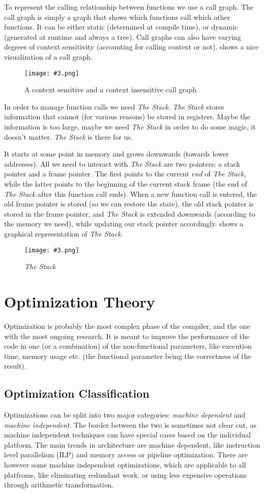 \documentclass{article}
\newcommand{\fig}[4]{
	\begin{figure}[#1]
		\center
		\texttt{[image: \#3.png]}
		\caption{#4}
		\label{fig:#3}
	\end{figure}
	}
\begin{document}
To represent the calling relationship between functions we use a call graph.
The call graph is simply a graph that shows which functions call which other functions.
It can be either static (determined at compile time), or dynamic (generated at runtime and always a tree).
Call graphs can also have varying degrees of context sensitivity (accounting for calling context or not).
 shows a nice visualization of a call graph.

\fig{h}{0.9}{calling}{A context sensitive and a context insensitive call graph}

In order to manage function calls we need \emph{The Stack}.
\emph{The Stack} stores information that cannot (for various reasons) be stored in registers.
Maybe the information is too large, maybe we need \emph{The Stack} in order to do some magic, it doesn't matter.
\emph{The Stack} is there for us.

It starts at some point in memory and grows downwards (towards lower addresses).
All we need to interact with \emph{The Stack} are two pointers: a stack pointer and a frame pointer.
The first points to the current \emph{end} of \emph{The Stack}, while the latter points to the beginning of the current stack frame (the end of \emph{The Stack} after this function call ends).
When a new function call is entered, the old frame pointer is stored (so we can restore the state), the old stack pointer is stored in the frame pointer, and \emph{The Stack} is extended downwards (according to the memory we need), while updating our stack pointer accordingly.
 shows a graphical representation of \emph{The Stack}.

\fig{h}{0.4}{thestack}{\emph{The Stack}}

\section{Optimization Theory}
Optimization is probably the most complex phase of the compiler, and the one with the most ongoing research.
It is meant to improve the performance of the code in one (or a combination) of the non-functional parameters, like execution time, memory usage etc. (the functional parameter being the correctness of the result).

\subsection{Optimization Classification}
Optimizations can be split into two major categories: \emph{machine dependent} and \emph{machine independent}.
The border between the two is sometimes not clear cut, as machine independent techniques can have special cases based on the individual platform.
The main trends in architecture are machine dependent, like instruction level parallelism (ILP) and memory access or pipeline optimization.
There are however some machine independent optimizations, which are applicable to all platfroms, like eliminating redundant work, or using less expensive operations through arithmetic transformation.
\end{document}
